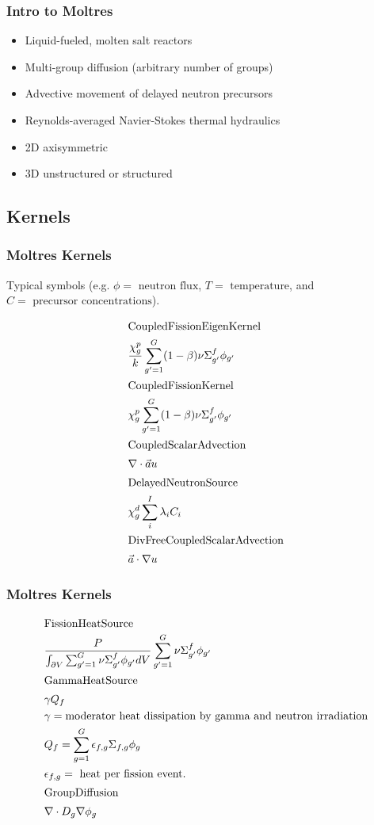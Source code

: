 \begin{frame}
	\frametitle{Intro to Moltres}
    	\begin{itemize}
			\item Liquid-fueled, molten salt reactors
			\item Multi-group diffusion (arbitrary number of groups)
			\item Advective movement of delayed neutron precursors
			\item Reynolds-averaged Navier-Stokes thermal hydraulics
			\item 2D axisymmetric
			\item 3D unstructured or structured
	    \end{itemize}
\end{frame}

\subsection{Kernels}
\begin{frame}
        \frametitle{Moltres Kernels}
        \footnotesize{Typical symbols (e.g. $\phi=\mbox{ neutron flux}$, 
                $T=\mbox{ temperature}$, and $C=\mbox{ precursor 
                concentrations}$).

\begin{align*}
\intertext{CoupledFissionEigenKernel} 
&\frac{\chi_g^p}{k} \sum_{g' = 1}^G (1 -
        \beta) \nu \Sigma_{g'}^f \phi_{g'}\\
\intertext{CoupledFissionKernel} 
&\chi_g^p \sum_{g' = 1}^G (1 -
        \beta) \nu \Sigma_{g'}^f \phi_{g'}\\
\intertext{CoupledScalarAdvection} 
&\nabla \cdot \vec{a} u\\
\intertext{DelayedNeutronSource} 
&\chi_g^d \sum_i^I \lambda_i C_i\\
\intertext{DivFreeCoupledScalarAdvection}
&\vec{a} \cdot \nabla u
\end{align*}}
\end{frame}

\begin{frame}
        \frametitle{Moltres Kernels}
        \footnotesize{
\begin{align*}
\intertext{FissionHeatSource}
&\frac{P}{\int_{\partial V} \sum_{g' = 1}^G \nu \Sigma_{g'}^f \phi_{g'} dV}
\sum_{g' = 1}^G \nu \Sigma_{g'}^f \phi_{g'}\\
\intertext{GammaHeatSource} &\gamma Q_f\\
        &\gamma = \mbox{moderator heat dissipation by gamma and neutron 
        irradiation}\\
        &Q_f = \sum_{g=1}^G \epsilon_{f,g}\Sigma_{f,g}\phi_g\\
        &\epsilon_{f,g} = \mbox{ heat per fission event.}\\
\intertext{GroupDiffusion}
& \nabla \cdot D_g
        \nabla \phi_g\\
\end{align*}
}
\end{frame}

